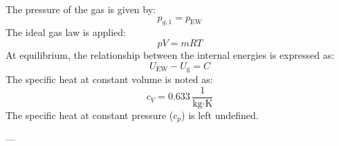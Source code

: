 The pressure of the gas is given by:  
\[
p_{g,1} = p_{\text{EW}}
\]  
The ideal gas law is applied:  
\[
p V = m R T
\]  
At equilibrium, the relationship between the internal energies is expressed as:  
\[
U_{\text{EW}} - U_{\text{g}} = C
\]  
The specific heat at constant volume is noted as:  
\[
c_V = 0.633 \, \frac{1}{\text{kg·K}}
\]  
The specific heat at constant pressure (\( c_p \)) is left undefined.

---